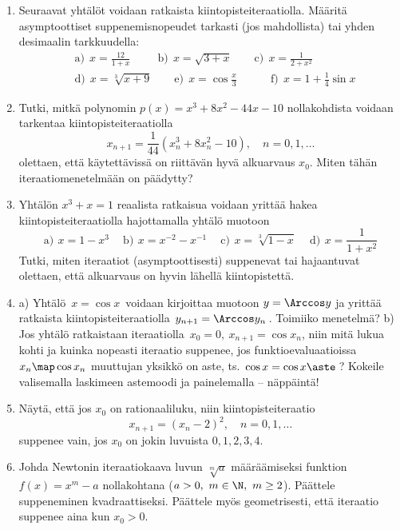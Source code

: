 \Harj
\begin{enumerate}

\item
Seuraavat yhtälöt voidaan ratkaista kiintopisteiteraatiolla. Määritä asymptoottiset 
suppenemisnopeudet tarkasti (jos mahdollista) tai yhden desimaalin tarkkuudella:
\begin{align*}
&\text{a)}\ \ x=\frac{12}{1+x} \qquad\ \
 \text{b)}\ \ x=\sqrt{3+x} \qquad
 \text{c)}\ \ x=\frac{1}{2+x^2} \\
&\text{d)}\ \ x=\sqrt[3]{x+9} \qquad 
 \text{e)}\ \ x=\cos\frac{x}{3} \qquad\quad 
 \text{f)}\ \ x=1+\frac{1}{4}\sin x
\end{align*}

\item
Tutki, mitkä polynomin $p(x)=x^3+8x^2-44x-10$ nollakohdista voidaan tarkentaa
kiintopisteiteraatiolla
\[
x_{n+1}=\frac{1}{44}(x_n^3+8x_n^2-10), \quad n=0,1,\ldots
\]
olettaen, että käytettävissä on riittävän hyvä alkuarvaus $x_0$. Miten tähän 
iteraatiomenetelmään on päädytty?

\item
Yhtälön $x^3+x=1$ reaalista ratkaisua voidaan yrittää hakea kiintopisteiteraatiolla
hajottamalla yhtälö muotoon
\[
\text{a)}\,\ x=1-x^3 \quad\ 
\text{b)}\,\ x=x^{-2}-x^{-1} \quad\
\text{c)}\,\ x=\sqrt[3]{1-x} \quad\
\text{d)}\,\ x=\frac{1}{1+x^2}
\]
Tutki, miten iteraatiot (asymptoottisesti) suppenevat tai hajaantuvat olettaen, että
alkuarvaus on hyvin lähellä kiintopistettä.

\item
a) Yhtälö $\,x=\cos x\,$ voidaan kirjoittaa muotoon $y=\Arccos y$ ja yrittää ratkaista 
kiintopisteiteraatiolla $\,y_{n+1}=\Arccos y_n\,$. Toimiiko menetelmä? \newline
b) Jos yhtälö ratkaistaan iteraatiolla $\,x_0=0,\ x_{n+1}=\cos x_n$, niin mitä lukua kohti ja 
kuinka nopeasti iteraatio suppenee, jos funktioevaluaatioissa $x_n \map \cos x_n$ muuttujan
yksikkö on aste, ts.\ $\cos x=\cos x\aste$\,? Kokeile valisemalla laskimeen astemoodi ja
painelemalla \fbox{$\cos$} -- näppäintä!

\item
Näytä, että jos $x_0$ on rationaaliluku, niin kiintopisteiteraatio
\[
x_{n+1}=(x_n-2)^2, \quad n=0,1,\ldots
\]
suppenee vain, jos $x_0$ on jokin luvuista $0,1,2,3,4$.

\item
Johda Newtonin iteraatiokaava luvun $\sqrt[m]{a}$ määräämiseksi funktion $f(x)=x^m-a$
nollakohtana ($a>0,\ m\in\N,\ m \ge 2$). Päättele suppeneminen kvadraattiseksi. Päättele myös 
geometrisesti, että iteraatio suppenee aina kun $x_0>0$.


\end{enumerate}
